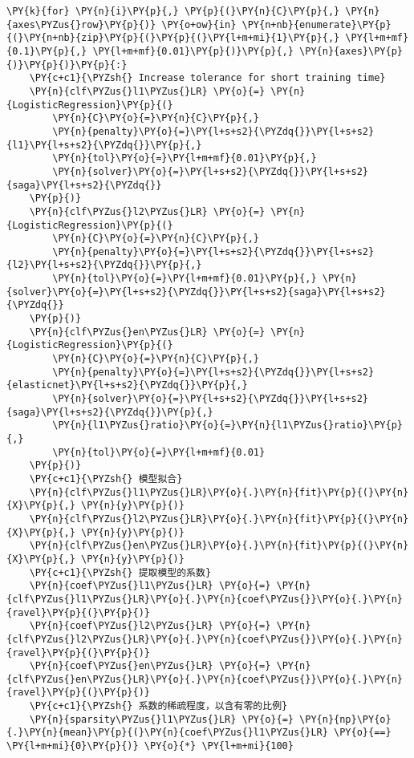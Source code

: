\begin{Verbatim}[commandchars=\\\{\}]
\PY{k}{for} \PY{n}{i}\PY{p}{,} \PY{p}{(}\PY{n}{C}\PY{p}{,} \PY{n}{axes\PYZus{}row}\PY{p}{)} \PY{o+ow}{in} \PY{n+nb}{enumerate}\PY{p}{(}\PY{n+nb}{zip}\PY{p}{(}\PY{p}{(}\PY{l+m+mi}{1}\PY{p}{,} \PY{l+m+mf}{0.1}\PY{p}{,} \PY{l+m+mf}{0.01}\PY{p}{)}\PY{p}{,} \PY{n}{axes}\PY{p}{)}\PY{p}{)}\PY{p}{:}
    \PY{c+c1}{\PYZsh{} Increase tolerance for short training time}
    \PY{n}{clf\PYZus{}l1\PYZus{}LR} \PY{o}{=} \PY{n}{LogisticRegression}\PY{p}{(}
        \PY{n}{C}\PY{o}{=}\PY{n}{C}\PY{p}{,} 
        \PY{n}{penalty}\PY{o}{=}\PY{l+s+s2}{\PYZdq{}}\PY{l+s+s2}{l1}\PY{l+s+s2}{\PYZdq{}}\PY{p}{,} 
        \PY{n}{tol}\PY{o}{=}\PY{l+m+mf}{0.01}\PY{p}{,} 
        \PY{n}{solver}\PY{o}{=}\PY{l+s+s2}{\PYZdq{}}\PY{l+s+s2}{saga}\PY{l+s+s2}{\PYZdq{}}
    \PY{p}{)}
    \PY{n}{clf\PYZus{}l2\PYZus{}LR} \PY{o}{=} \PY{n}{LogisticRegression}\PY{p}{(}
        \PY{n}{C}\PY{o}{=}\PY{n}{C}\PY{p}{,} 
        \PY{n}{penalty}\PY{o}{=}\PY{l+s+s2}{\PYZdq{}}\PY{l+s+s2}{l2}\PY{l+s+s2}{\PYZdq{}}\PY{p}{,} 
        \PY{n}{tol}\PY{o}{=}\PY{l+m+mf}{0.01}\PY{p}{,} \PY{n}{solver}\PY{o}{=}\PY{l+s+s2}{\PYZdq{}}\PY{l+s+s2}{saga}\PY{l+s+s2}{\PYZdq{}}
    \PY{p}{)}
    \PY{n}{clf\PYZus{}en\PYZus{}LR} \PY{o}{=} \PY{n}{LogisticRegression}\PY{p}{(}
        \PY{n}{C}\PY{o}{=}\PY{n}{C}\PY{p}{,} 
        \PY{n}{penalty}\PY{o}{=}\PY{l+s+s2}{\PYZdq{}}\PY{l+s+s2}{elasticnet}\PY{l+s+s2}{\PYZdq{}}\PY{p}{,} 
        \PY{n}{solver}\PY{o}{=}\PY{l+s+s2}{\PYZdq{}}\PY{l+s+s2}{saga}\PY{l+s+s2}{\PYZdq{}}\PY{p}{,} 
        \PY{n}{l1\PYZus{}ratio}\PY{o}{=}\PY{n}{l1\PYZus{}ratio}\PY{p}{,} 
        \PY{n}{tol}\PY{o}{=}\PY{l+m+mf}{0.01}
    \PY{p}{)}
    \PY{c+c1}{\PYZsh{} 模型拟合}
    \PY{n}{clf\PYZus{}l1\PYZus{}LR}\PY{o}{.}\PY{n}{fit}\PY{p}{(}\PY{n}{X}\PY{p}{,} \PY{n}{y}\PY{p}{)}
    \PY{n}{clf\PYZus{}l2\PYZus{}LR}\PY{o}{.}\PY{n}{fit}\PY{p}{(}\PY{n}{X}\PY{p}{,} \PY{n}{y}\PY{p}{)}
    \PY{n}{clf\PYZus{}en\PYZus{}LR}\PY{o}{.}\PY{n}{fit}\PY{p}{(}\PY{n}{X}\PY{p}{,} \PY{n}{y}\PY{p}{)}
    \PY{c+c1}{\PYZsh{} 提取模型的系数}
    \PY{n}{coef\PYZus{}l1\PYZus{}LR} \PY{o}{=} \PY{n}{clf\PYZus{}l1\PYZus{}LR}\PY{o}{.}\PY{n}{coef\PYZus{}}\PY{o}{.}\PY{n}{ravel}\PY{p}{(}\PY{p}{)}
    \PY{n}{coef\PYZus{}l2\PYZus{}LR} \PY{o}{=} \PY{n}{clf\PYZus{}l2\PYZus{}LR}\PY{o}{.}\PY{n}{coef\PYZus{}}\PY{o}{.}\PY{n}{ravel}\PY{p}{(}\PY{p}{)}
    \PY{n}{coef\PYZus{}en\PYZus{}LR} \PY{o}{=} \PY{n}{clf\PYZus{}en\PYZus{}LR}\PY{o}{.}\PY{n}{coef\PYZus{}}\PY{o}{.}\PY{n}{ravel}\PY{p}{(}\PY{p}{)}
    \PY{c+c1}{\PYZsh{} 系数的稀疏程度，以含有零的比例}
    \PY{n}{sparsity\PYZus{}l1\PYZus{}LR} \PY{o}{=} \PY{n}{np}\PY{o}{.}\PY{n}{mean}\PY{p}{(}\PY{n}{coef\PYZus{}l1\PYZus{}LR} \PY{o}{==} \PY{l+m+mi}{0}\PY{p}{)} \PY{o}{*} \PY{l+m+mi}{100}

\end{Verbatim}
